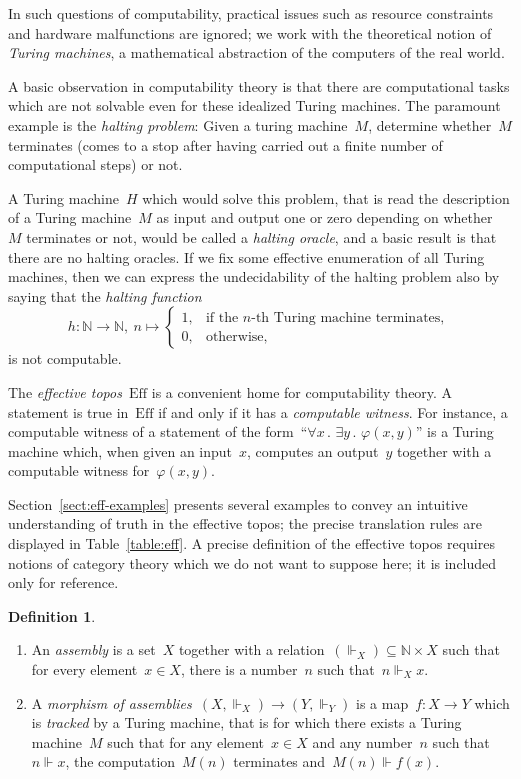 \documentclass[oneside,reqno]{amsart}
\theoremstyle{definition}
\newtheorem{defn}{Definition}[section]
\theoremstyle{plain}
\theoremstyle{remark}
\newcommand{\NN}{\mathbb{N}}
\newcommand{\Eff}{\mathrm{Ef{}f}}
\renewcommand{\_}{\mathpunct{.}\,}
\newcommand{\effective}{ef{}fective\xspace}
\newcommand{\?}{\,{:}\,}
\newcommand{\realizes}{\Vdash}
\begin{document}
In such questions of computability, practical issues such as resource
constraints and hardware malfunctions are ignored; we work with the theoretical
notion of \emph{Turing machines}, a mathematical abstraction of the computers
of the real world.

A basic observation in computability theory is that there are computational tasks
which are not solvable even for these idealized Turing machines. The paramount
example is the \emph{halting problem}: Given a turing machine~$M$, determine
whether~$M$ terminates (comes to a stop after having carried out a finite
number of computational steps) or not.

A Turing machine~$H$ which would solve this problem, that is read the
description of a Turing machine~$M$ as input and output one or zero depending
on whether~$M$ terminates or not, would be called a \emph{halting oracle}, and
a basic result is that there are no halting oracles. If we fix some \effective
enumeration of all Turing machines, then we can express the undecidability of
the halting problem also by saying that the \emph{halting function}
\[ h : \NN \longrightarrow \NN,\ n \longmapsto \begin{cases}
  1, & \text{if the~$n$-th Turing machine terminates}, \\
  0, & \text{otherwise,}
\end{cases} \]
is not computable.

The \emph{\effective topos}~$\Eff$ is a convenient home for computability
theory. A statement is true in~$\Eff$ if and only if it has a \emph{computable
witness}. For instance, a computable witness of a statement of the
form~``$\forall x\_ \exists y\_ \varphi(x,y)$'' is a Turing machine which, when
given an input~$x$, computes an output~$y$ together with a computable witness
for~$\varphi(x,y)$.

Section~\ref{sect:eff-examples} presents several examples to convey an
intuitive understanding of truth in the \effective topos; the precise
translation rules are displayed in Table~\ref{table:eff}. A precise definition
of the \effective topos requires notions of category theory which we do not
want to suppose here; it is included only for reference.

\begin{defn}\begin{enumerate}
\item An \emph{assembly} is a set~$X$ together with a
relation~$({\realizes_X}) \subseteq \NN \times X$ such that for every element~$x
\in X$, there is a number~$n$ such that~$n \realizes_X x$.
\item A \emph{morphism of
assemblies}~$(X,{\realizes_X}) \to (Y,{\realizes_Y})$ is a map~$f : X \to Y$
which is \emph{tracked} by a Turing machine, that is for which there exists a
Turing machine~$M$ such that for any element~$x \in X$ and any number~$n$ such
that~$n \realizes x$, the computation~$M(n)$ terminates and~$M(n) \realizes
f(x)$.\end{enumerate}\end{defn}
\end{document}

